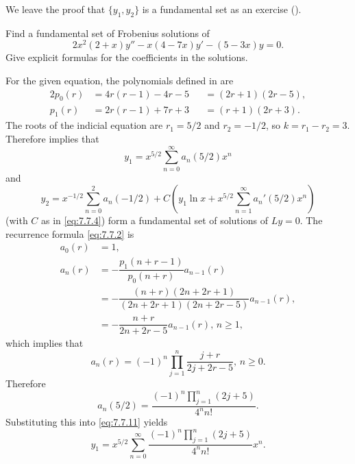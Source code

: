 We leave the proof that $\{y_1,y_2\}$ is a fundamental set as an
exercise ().


\begin{example}\label{example:7.7.1}
Find a fundamental set of Frobenius  solutions of
\[
2x^2(2+x)y''-x(4-7x)y'-(5-3x)y=0.
\]
Give explicit  formulas for the coefficients in the solutions.
\end{example}

\begin{solution}
For  the given equation, the polynomials defined in
 are
\begin{alignat*}{2}
p_0(r)&=4r(r-1)-4r-5&&=(2r+1)(2r-5),\\
p_1(r)&=2r(r-1)+7r+3&&=(r+1)(2r+3).
\end{alignat*}
The roots of the indicial equation are $r_1=5/2$ and $r_2=-1/2$,
so $k=r_1-r_2=3$. Therefore  implies that
\begin{equation} \label{eq:7.7.11}
y_1=x^{5/2}\sum_{n=0}^\infty a_n(5/2)x^n
\end{equation}
and
\begin{equation} \label{eq:7.7.12}
y_2=x^{-1/2}\sum_{n=0}^2a_n(-1/2)+C\left(y_1\ln
x+x^{5/2}\sum_{n=1}^\infty a_n'(5/2)x^n\right)
\end{equation}
(with $C$ as in \eqref{eq:7.7.4})
form a fundamental set of solutions of $Ly=0$. The recurrence
formula \eqref{eq:7.7.2} is
\begin{equation} \label{eq:7.7.13}
\begin{aligned}
a_0(r)&=1,\\
a_n(r)&=-\dfrac{p_1(n+r-1)}{p_0(n+r)}a_{n-1}(r)\\
&=-\dfrac{(n+r)(2n+2r+1)}{(2n+2r+1)(2n+2r-5)}a_{n-1}(r),\\
&=-\dfrac{n+r}{2n+2r-5}a_{n-1}(r),\,n\ge1,
\end{aligned}
\end{equation}
which implies that
\begin{equation} \label{eq:7.7.14}
a_n(r)=(-1)^n\prod_{j=1}^n\frac{j+r}{2j+2r-5},\,n\ge0.
\end{equation}
Therefore
\begin{equation} \label{eq:7.7.15}
a_n(5/2)=\frac{(-1)^n\prod_{j=1}^n(2j+5)}{4^nn!}.
\end{equation}
Substituting this into \eqref{eq:7.7.11} yields
\[
y_1=x^{5/2}\sum_{n=0}^\infty\frac{(-1)^n\prod_{j=1}^n(2j+5)}{4^nn!}x^n.
\]


\end{solution}
